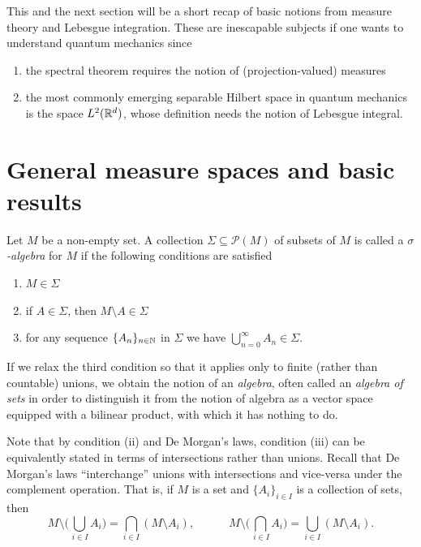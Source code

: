 
This and the next section will be a short recap of basic notions from
measure theory and Lebesgue integration. These are inescapable
subjects if one wants to understand quantum mechanics since

\begin{enumerate}[label=(\roman*)]
\item the spectral theorem requires the notion of (projection-valued)
  measures
\item the most commonly emerging separable Hilbert space in quantum
  mechanics is the space $L^2(\mathbb{R}^d)$, whose definition needs the
  notion of Lebesgue integral.
\end{enumerate}

\section{General measure spaces and basic results}

\begin{definition}
Let $M$ be a non-empty set. A collection $\Sigma\subseteq\mathscr{P}(M)
$ of subsets of $M$ is called a \emph{$\sigma$-algebra} for $M$ if the following conditions are satisfied
\begin{enumerate}[label=(\roman*)]
\item $M\in \Sigma$
\item if $A\in \Sigma$, then $M\setminus A \in \Sigma$
\item for any sequence $\{A_n\}_{n\in \mathbb{N}}$ in $\Sigma$ we have $\bigcup_{n=0}^{\infty}A_n\in\Sigma$.
\end{enumerate}
\end{definition}

\begin{remark}
If we relax the third condition so that it applies only to finite (rather than countable) unions, we obtain the notion of an \emph{algebra}, often called an \emph{algebra of sets} in order to distinguish it from the notion of algebra as a vector space equipped with a bilinear product, with which it has nothing to do. 
\end{remark}

\begin{remark}
Note that by condition (ii) and De Morgan's laws, condition (iii) can be equivalently stated in terms of intersections rather than unions. Recall that De Morgan's laws ``interchange'' unions with intersections and vice-versa under the complement operation. That is, if $M$ is a set and $\{A_i\}_{i\in I}$ is a collection of sets, then
\begin{equation*}
M \setminus \biggl(\bigcup_{\,i\in I}A_i\biggr) = \bigcap_{i\in I}(M\setminus A_i),\qquad \quad
M \setminus \biggl(\bigcap_{\,i\in I}A_i\biggr) = \bigcup_{i\in I}(M\setminus A_i).
\end{equation*}
\end{remark}

